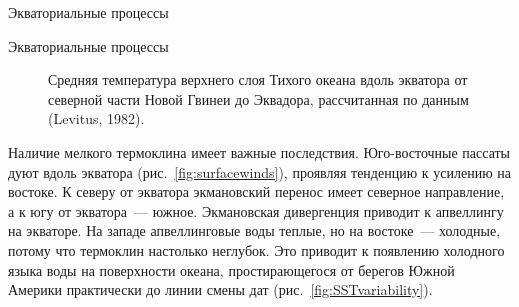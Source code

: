 \begin{chapter}{Экваториальные процессы}
\begin{section}{Экваториальные процессы}
\begin{figure}[t!]
\begin{centering}
\end{centering}
\caption{Средняя температура верхнего слоя Тихого океана вдоль экватора от
северной части Новой Гвинеи до Эквадора, рассчитанная по данным
(Levitus, 1982).}  
\label{fig:equator}
\vspace{-2ex}
\end{figure}
%
%

Наличие мелкого термоклина имеет важные последствия. 
Юго-восточные пассаты дуют вдоль экватора (рис.~\ref{fig:surfacewinds}), 
проявляя тенденцию к усилению на востоке. 
К северу от экватора экмановский перенос%
 имеет
северное направление, а к югу от экватора~--- южное. Экмановская дивергенция
приводит к апвеллингу  на экваторе. На западе
апвеллинговые воды теплые, но на востоке~--- холодные, потому что термоклин
настолько неглубок. Это приводит к появлению холодного языка воды на
поверхности океана, простирающегося от берегов Южной Америки
практически до линии смены дат (рис.~\ref{fig:SSTvariability}). 
%



\end{section}
\end{chapter}
